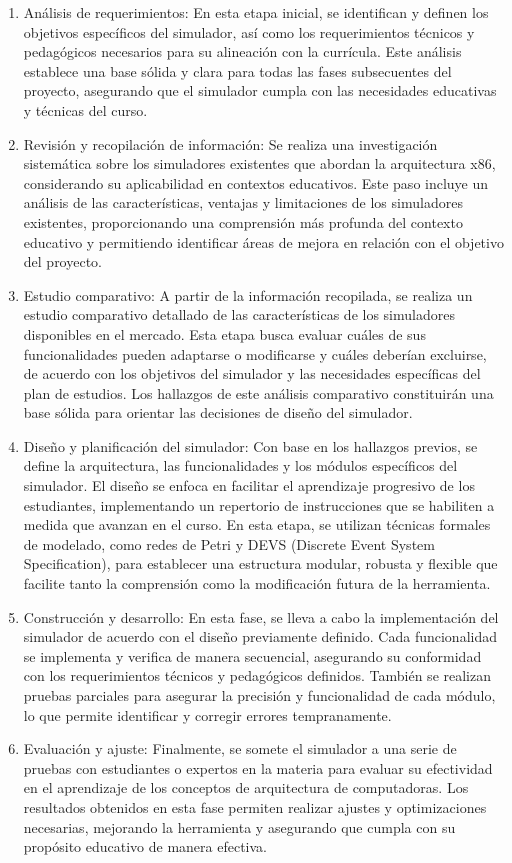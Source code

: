 \documentclass[12pt,oneside]{templates/unerthesis}
\begin{document}
\begin{enumerate}
\def\labelenumi{\arabic{enumi}.}
\item
  Análisis de requerimientos: En esta etapa inicial, se identifican y definen los objetivos específicos del simulador, así como los requerimientos técnicos y pedagógicos necesarios para su alineación con la currícula. Este análisis establece una base sólida y clara para todas las fases subsecuentes del proyecto, asegurando que el simulador cumpla con las necesidades educativas y técnicas del curso.
\item
  Revisión y recopilación de información: Se realiza una investigación sistemática sobre los simuladores existentes que abordan la arquitectura x86, considerando su aplicabilidad en contextos educativos. Este paso incluye un análisis de las características, ventajas y limitaciones de los simuladores existentes, proporcionando una comprensión más profunda del contexto educativo y permitiendo identificar áreas de mejora en relación con el objetivo del proyecto.
\item
  Estudio comparativo: A partir de la información recopilada, se realiza un estudio comparativo detallado de las características de los simuladores disponibles en el mercado. Esta etapa busca evaluar cuáles de sus funcionalidades pueden adaptarse o modificarse y cuáles deberían excluirse, de acuerdo con los objetivos del simulador y las necesidades específicas del plan de estudios. Los hallazgos de este análisis comparativo constituirán una base sólida para orientar las decisiones de diseño del simulador.
\item
  Diseño y planificación del simulador: Con base en los hallazgos previos, se define la arquitectura, las funcionalidades y los módulos específicos del simulador. El diseño se enfoca en facilitar el aprendizaje progresivo de los estudiantes, implementando un repertorio de instrucciones que se habiliten a medida que avanzan en el curso. En esta etapa, se utilizan técnicas formales de modelado, como redes de Petri y DEVS (Discrete Event System Specification), para establecer una estructura modular, robusta y flexible que facilite tanto la comprensión como la modificación futura de la herramienta.
\item
  Construcción y desarrollo: En esta fase, se lleva a cabo la implementación del simulador de acuerdo con el diseño previamente definido. Cada funcionalidad se implementa y verifica de manera secuencial, asegurando su conformidad con los requerimientos técnicos y pedagógicos definidos. También se realizan pruebas parciales para asegurar la precisión y funcionalidad de cada módulo, lo que permite identificar y corregir errores tempranamente.
\item
  Evaluación y ajuste: Finalmente, se somete el simulador a una serie de pruebas con estudiantes o expertos en la materia para evaluar su efectividad en el aprendizaje de los conceptos de arquitectura de computadoras. Los resultados obtenidos en esta fase permiten realizar ajustes y optimizaciones necesarias, mejorando la herramienta y asegurando que cumpla con su propósito educativo de manera efectiva.
\end{enumerate}
\end{document}
